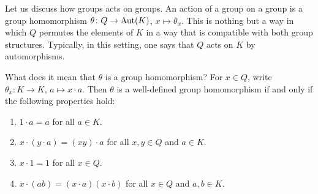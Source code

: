





Let us discuss how groups acts on groups. An action of a group on a group is 
a group homomorphism 
$\theta\colon Q\to\operatorname{Aut}(K)$, $x\mapsto\theta_x$. 
This is nothing but a way in which $Q$ permutes the elements of $K$ 
in a way that is compatible with both group structures. Typically, in this setting, 
one says that $Q$ acts on $K$ by automorphisms. 

What does it mean that $\theta$ is a group homomorphism? 
For $x\in Q$, write $\theta_x\colon K\to K$, $a\mapsto x\cdot a$. 
Then $\theta$ is a well-defined group homomorphism if and only if 
the following properties hold: 
\begin{enumerate}
    \item $1\cdot a=a$ for all $a\in K$. 
    \item $x\cdot (y\cdot a)=(xy)\cdot a$ for all $x,y\in Q$ and $a\in K$.
    \item $x\cdot 1=1$ for all $x\in Q$. 
    \item $x\cdot (ab)=(x\cdot a)(x\cdot b)$ for all $x\in Q$ and $a,b\in K$. 
\end{enumerate}

